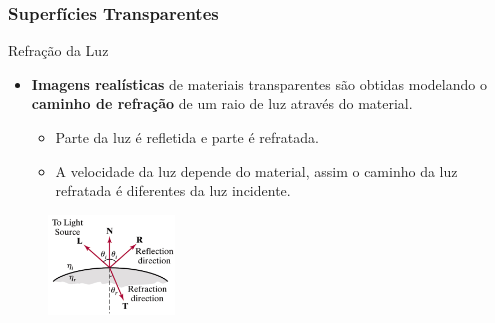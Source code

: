 \documentclass{beamer}
\begin{document}
\begin{frame}
\frametitle{Superfícies Transparentes}

	\begin{block}{Refração da Luz}
		\begin{itemize}
			\item \textbf{Imagens realísticas} de materiais transparentes são obtidas modelando o \textbf{caminho de refração} de um raio de luz através do material.
			\begin{itemize}
				\item Parte da luz é refletida e parte é refratada.
				\item A velocidade da luz depende do material, assim o caminho da luz refratada é diferentes da luz incidente.
			\end{itemize}
		\end{itemize}
	\end{block}
	
	\begin{figure}[!h]
		\begin{center}
		\includegraphics[width=0.3\textwidth]{Figures/LigRef}
		\end{center}
	\end{figure}	
\end{frame}
\end{document}
